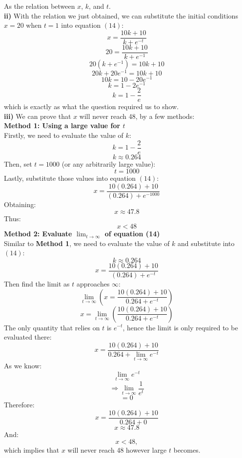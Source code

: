 \documentclass[hidelinks, a4paper, 12pt]{article}
\begin{document}
            As the relation between $x$, $k$, and $t$.\\[\baselineskip]
            \textbf{ii)} With the relation we just obtained, we can substitute the initial conditions $x = 20$ when $t = 1$ into equation $(14)$:
            \[x = \frac{10k+10}{k + e^{-t}}\]
            \[20 = \frac{10k+10}{k + e^{-1}}\]
            \[20(k + e^{-1}) = 10k+10\]
            \[20k + 20e^{-1} = 10k+10\]
            \[10k = 10 - 20e^{-1}\]
            \[k = 1 - 2e^{-1}\]
            \[k = 1 - \frac{2}{e}\]
            which is exactly as what the question required us to show.\\[\baselineskip]
            \textbf{iii)} We can prove that $x$ will never reach 48, by a few methods:\\[\baselineskip]
            \textbf{Method 1: Using a large value for $t$}\\[\baselineskip]
            Firstly, we need to evaluate the value of $k$:
            \[k = 1 - \frac{2}{e}\]
            \[k \approx0.264\]
            Then, set $t = 1000$ (or any arbitrarily large value):
            \[t = 1000\] 
            Lastly, substitute those values into equation $(14)$:
            \[x = \frac{10(0.264)+10}{(0.264) + e^{-1000}}\]
            Obtaining:
            \[x \approx 47.8\]
            Thus:
            \[x < 48\]
            \textbf{Method 2: Evaluate $\lim_{t\to\infty}$ of equation (14)}\\[\baselineskip]
            Similar to \textbf{Method 1}, we need to evaluate the value of $k$ and substitute into $(14)$:
            \[k \approx0.264\]
            \[x = \frac{10(0.264)+10}{(0.264) + e^{-t}}\]
            Then find the limit as $t$ approaches $\infty$:
            \[\lim_{t\to\infty} \left(x = \frac{10(0.264)+10}{0.264 + e^{-t}}\right)\]
            \[x = \lim_{t\to\infty}\left(\frac{10(0.264)+10}{0.264 + e^{-t}}\right)\]
            The only quantity that relies on $t$ is $e^{-t}$, hence the limit is only required to be evaluated there:
            \[x = \frac{10(0.264)+10}{0.264 + \lim_{t\to\infty}e^{-t}}\]
            As we know:
            \[\lim_{t\to\infty}e^{-t}\]
            \[\Rightarrow \lim_{t\to\infty}\frac{1}{e^t}\]
            \[=0\]
            Therefore:
            \[x = \frac{10(0.264)+10}{0.264 + 0}\]
            \[x \approx 47.8\]
            And:
            \[x < 48,\]
            which implies that $x$ will never reach 48 however large $t$ becomes.
    
    
    
\end{document}

